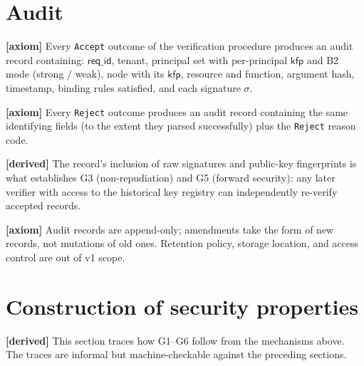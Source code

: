 \documentclass[11pt,a4paper]{article}
\newcommand{\axiom}{\textcolor{axiomcolor}{\textbf{[axiom]}}\xspace}
\newcommand{\derived}{\textcolor{derivedcolor}{\textbf{[derived]}}\xspace}
\begin{document}
\section{Audit}
\label{sec:audit}

\axiom{} Every \texttt{Accept} outcome of the verification procedure
produces an audit record containing: $\mathsf{req\_id}$, tenant,
principal set with per-principal $\mathsf{kfp}$ and B2 mode
(strong / weak), node with its $\mathsf{kfp}$, resource and function,
argument hash, timestamp, binding rules satisfied, and each signature
$\sigma$.

\axiom{} Every \texttt{Reject} outcome produces an audit record
containing the same identifying fields (to the extent they parsed
successfully) plus the \texttt{Reject} reason code.

\derived{} The record's inclusion of raw signatures and public-key
fingerprints is what establishes G3 (non-repudiation) and G5 (forward
security): any later verifier with access to the historical key
registry can independently re-verify accepted records.

\axiom{} Audit records are append-only; amendments take the form of
new records, not mutations of old ones. Retention policy, storage
location, and access control are out of v1 scope.

\section{Construction of security properties}
\label{sec:construction}

\derived{} This section traces how G1--G6 follow from the mechanisms
above. The traces are informal but machine-checkable against the
preceding sections.
\end{document}
